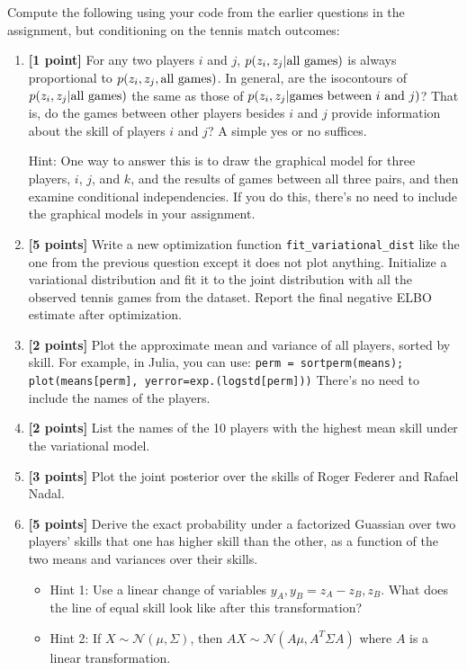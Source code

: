 \documentclass{article}
\begin{document}
Compute the following using your code from the earlier questions in the assignment, but conditioning on the tennis match outcomes:
\begin{enumerate}[label=(\alph*)]
\item {\bf [1 point]} For any two players $i$ and $j$, $p(z_i, z_j | \textnormal{all games})$ is always proportional to
	$p(z_i, z_j , \textnormal{all games})$.
	In general, are the isocontours of $p(z_i, z_j | \textnormal{all games})$ the same as those of
	$p(z_i, z_j | \textnormal{games between $i$ and $j$})$?  That is, do the games between
	other players besides $i$ and $j$ provide information about the skill of
	players $i$ and $j$?  A simple yes or no suffices.
	
	Hint: One way to answer this is to draw the graphical model for three players,
	$i$, $j$, and $k$, and the results of games between all three pairs, and then
	examine conditional independencies.  If you do this, there's no need to include
	the graphical models in your assignment.
\item {\bf [5 points]} Write a new optimization function \texttt{fit\_variational\_dist} like the one from the 
  previous question except it does not plot anything.
  Initialize a variational distribution and fit it to the joint distribution with all the observed tennis games from the dataset.
  Report the final negative ELBO estimate after optimization.
\item {\bf [2 points]} Plot the approximate mean and variance of all players, sorted by skill.  For example, in Julia, you can use:
\texttt{perm = sortperm(means);
	plot(means[perm], yerror=exp.(logstd[perm]))}
There's no need to include the names of the players.
\item {\bf [2 points]} List the names of the 10 players with the highest mean skill under the variational model.
\item {\bf [3 points]} Plot the joint posterior over the skills of Roger Federer and Rafael Nadal.
\item {\bf [5 points]} Derive the exact probability under a factorized Guassian over two players' skills that one has higher skill than the other, as a function of the two means and variances over their skills.
\begin{itemize}
\item Hint 1: Use a linear change of variables $y_A, y_B = z_A - z_B, z_B$.  What does the line of equal skill look like after this transformation?
\item Hint 2: If $X \sim \mathcal{N}(\mu, \Sigma)$, then $AX \sim \mathcal{N}(A \mu, A^{T} \Sigma A)$ where $A$ is a linear transformation.

\end{itemize}
\end{enumerate}
\end{document}
